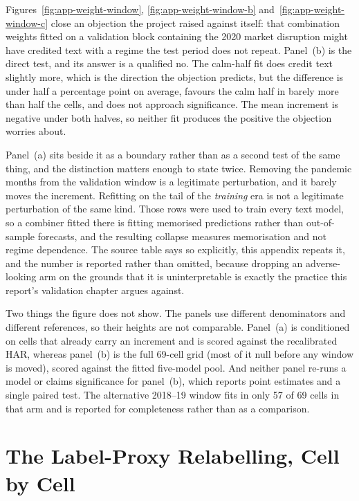 Figures~\ref{fig:app-weight-window}, \ref{fig:app-weight-window-b} and~\ref{fig:app-weight-window-c} close an objection the project raised
against itself: that combination weights fitted on a validation block
containing the 2020 market disruption might have credited text with a regime
the test period does not repeat. Panel~(b) is the direct test, and its answer
is a qualified no. The calm-half fit does credit text slightly more, which is
the direction the objection predicts, but the difference is under half a
percentage point on average, favours the calm half in barely more than half
the cells, and does not approach significance. The mean increment is
negative under both halves, so neither fit produces the positive the objection
worries about.

Panel~(a) sits beside it as a boundary rather than as a second test of the
same thing, and the distinction matters enough to state twice. Removing the
pandemic months from the validation window is a legitimate perturbation, and
it barely moves the increment. Refitting on the tail of the \emph{training}
era is not a legitimate perturbation of the same kind. Those rows were used to
train every text model, so a combiner fitted there is fitting memorised
predictions rather than out-of-sample forecasts, and the resulting collapse
measures memorisation and not regime dependence. The source table says so
explicitly, this appendix repeats it, and the number is reported rather than
omitted, because dropping an adverse-looking arm on the grounds that it is
uninterpretable is exactly the practice this report's validation chapter
argues against.

Two things the figure does not show. The panels use different denominators and
different references, so their heights are not comparable. Panel~(a) is
conditioned on cells that already carry an increment and is scored against the
recalibrated HAR, whereas panel~(b) is the full 69-cell grid (most of it
null before any window is moved), scored against the fitted five-model
pool. And neither panel re-runs a model or claims significance for panel~(b),
which reports point estimates and a single paired test. The alternative
2018--19 window fits in only 57 of 69 cells in that arm and is reported for
completeness rather than as a comparison.

\FloatBarrier
\section{The Label-Proxy Relabelling, Cell by Cell}
\label{app:res-rangebased-cells}

